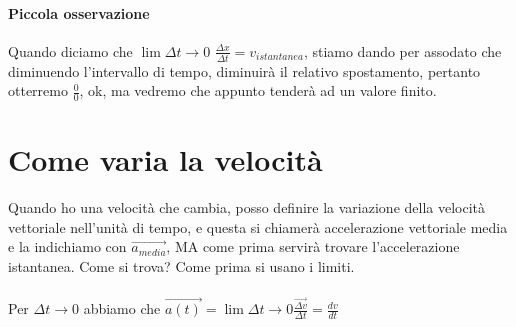 \documentclass[12pt, a4paper, openany, oneside]{book}
\begin{document}
\paragraph{Piccola osservazione} Quando diciamo che $\lim{\Delta t \to 0}$ 
$\frac{\Delta x}{\Delta t} = v_{istantanea}$, stiamo dando per assodato che
diminuendo l'intervallo di tempo, diminuirà il relativo spostamento, pertanto
otterremo $\frac{0}{0}$, ok, ma vedremo che appunto tenderà ad un valore finito.
\section{Come varia la velocità}
Quando ho una velocità che cambia, posso definire la variazione della velocità 
vettoriale nell'unità di tempo, e questa si chiamerà accelerazione vettoriale media
e la indichiamo con $\vec{a_{media}}$, MA come prima servirà trovare l'accelerazione 
istantanea. Come si trova? Come prima si usano i limiti.
\\ \\
Per $\Delta t \to 0$ abbiamo che $\vec{a(t)} = \lim{\Delta t \to 0} 
\frac{\vec{\Delta v}}{\Delta t} = \frac{dv}{dt} $
\end{document}
